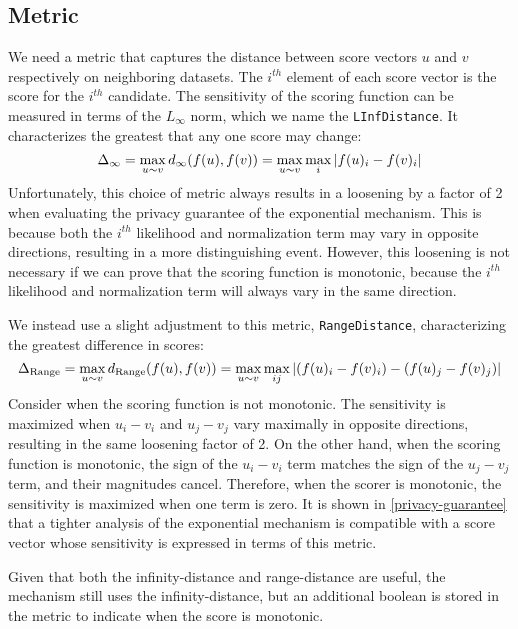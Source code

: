 \documentclass{article}
\begin{document}
\subsection{Metric}
We need a metric that captures the distance between score vectors $u$ and $v$ respectively on neighboring datasets. 
The $i^{th}$ element of each score vector is the score for the $i^{th}$ candidate.
The sensitivity of the scoring function can be measured in terms of the $L_\infty$ norm, which we name the \texttt{LInfDistance}. 
It characterizes the greatest that any one score may change:
\begin{equation}
    \Delta_{\infty} = \max_{u \sim v} d_{\infty}(f(u), f(v)) = \max\limits_{u \sim v} \max\limits_{i} \abs{f(u)_i - f(v)_i}
\end{equation}
Unfortunately, this choice of metric always results in a loosening by a factor of 2 when evaluating the privacy guarantee of the exponential mechanism.
This is because both the $i^{th}$ likelihood and normalization term may vary in opposite directions, resulting in a more distinguishing event.
However, this loosening is not necessary if we can prove that the scoring function is monotonic, because the $i^{th}$ likelihood and normalization term will always vary in the same direction.

We instead use a slight adjustment to this metric, \texttt{RangeDistance}, characterizing the greatest difference in scores:
\begin{equation}
    \Delta_{\text{Range}} = \max_{u \sim v} d_{\text{Range}}(f(u), f(v)) = \max\limits_{u \sim v} \max\limits_{ij} \abs{(f(u)_i - f(v)_i) - (f(u)_j - f(v)_j)}
\end{equation}
Consider when the scoring function is not monotonic.
The sensitivity is maximized when $u_i - v_i$ and $u_j - v_j$ vary maximally in opposite directions, resulting in the same loosening factor of 2.
On the other hand, when the scoring function is monotonic, the sign of the $u_i - v_i$ term matches the sign of the $u_j - v_j$ term,
and their magnitudes cancel.
Therefore, when the scorer is monotonic, the sensitivity is maximized when one term is zero. 
It is shown in \ref{privacy-guarantee} that a tighter analysis of the exponential mechanism is compatible with a score vector whose sensitivity is expressed in terms of this metric.

Given that both the infinity-distance and range-distance are useful, the mechanism still uses the infinity-distance,
but an additional boolean is stored in the metric to indicate when the score is monotonic.
\end{document}
